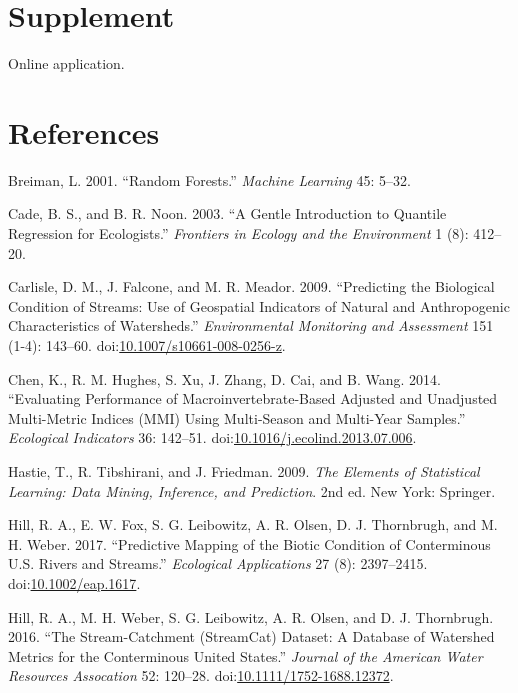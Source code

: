 \documentclass[]{article}
\begin{document}
\section{Supplement}\label{supplement}

Online application.

\section*{References}\label{references}

\hypertarget{refs}{}
\hypertarget{ref-Breiman01}{}
Breiman, L. 2001. ``Random Forests.'' \emph{Machine Learning} 45: 5--32.

\hypertarget{ref-Cade03}{}
Cade, B. S., and B. R. Noon. 2003. ``A Gentle Introduction to Quantile
Regression for Ecologists.'' \emph{Frontiers in Ecology and the
Environment} 1 (8): 412--20.

\hypertarget{ref-Carlisle09}{}
Carlisle, D. M., J. Falcone, and M. R. Meador. 2009. ``Predicting the
Biological Condition of Streams: Use of Geospatial Indicators of Natural
and Anthropogenic Characteristics of Watersheds.'' \emph{Environmental
Monitoring and Assessment} 151 (1-4): 143--60.
doi:\href{https://doi.org/10.1007/s10661-008-0256-z}{10.1007/s10661-008-0256-z}.

\hypertarget{ref-Chen14}{}
Chen, K., R. M. Hughes, S. Xu, J. Zhang, D. Cai, and B. Wang. 2014.
``Evaluating Performance of Macroinvertebrate-Based Adjusted and
Unadjusted Multi-Metric Indices (MMI) Using Multi-Season and Multi-Year
Samples.'' \emph{Ecological Indicators} 36: 142--51.
doi:\href{https://doi.org/10.1016/j.ecolind.2013.07.006}{10.1016/j.ecolind.2013.07.006}.

\hypertarget{ref-Hastie09}{}
Hastie, T., R. Tibshirani, and J. Friedman. 2009. \emph{The Elements of
Statistical Learning: Data Mining, Inference, and Prediction}. 2nd ed.
New York: Springer.

\hypertarget{ref-Hill17}{}
Hill, R. A., E. W. Fox, S. G. Leibowitz, A. R. Olsen, D. J. Thornbrugh,
and M. H. Weber. 2017. ``Predictive Mapping of the Biotic Condition of
Conterminous U.S. Rivers and Streams.'' \emph{Ecological Applications}
27 (8): 2397--2415.
doi:\href{https://doi.org/10.1002/eap.1617}{10.1002/eap.1617}.

\hypertarget{ref-Hill16}{}
Hill, R. A., M. H. Weber, S. G. Leibowitz, A. R. Olsen, and D. J.
Thornbrugh. 2016. ``The Stream-Catchment (StreamCat) Dataset: A Database
of Watershed Metrics for the Conterminous United States.'' \emph{Journal
of the American Water Resources Assocation} 52: 120--28.
doi:\href{https://doi.org/10.1111/1752-1688.12372}{10.1111/1752-1688.12372}.
\end{document}
